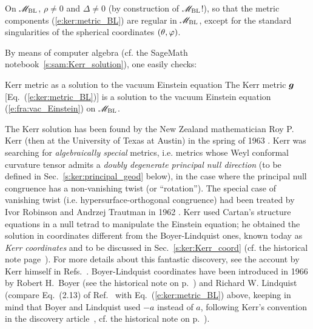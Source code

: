 \begin{remark}
On $\mathscr{M}_{\rm BL}$, $\rho\not=0$ and $\Delta\not=0$ (by construction
of $\mathscr{M}_{\rm BL}$!), so that the metric components (\ref{e:ker:metric_BL})
are regular in $\mathscr{M}_{\rm BL}$, except for the standard singularities of
the spherical coordinates $(\theta,\varphi)$.
\end{remark}

By means of computer algebra (cf. the SageMath notebook~\ref{s:sam:Kerr_solution}),
one easily checks:
\begin{tprop}{Kerr metric as a solution to the vacuum Einstein equation}{}
The Kerr metric $\bm{g}$ [Eq.~(\ref{e:ker:metric_BL})] is a solution to the vacuum
Einstein equation
(\ref{e:fra:vac_Einstein}) on $\mathscr{M}_{\rm BL}$.
\end{tprop}

\begin{hist}
\label{h:ker:Kerr_sol}
The Kerr solution has been found by the New Zealand mathematician Roy P. Kerr (then at the University of Texas at Austin) in the spring of 1963
\cite{Kerr63}. Kerr was searching for \emph{algebraically special} metrics, i.e. metrics whose Weyl conformal curvature
tensor admits a \emph{doubly degenerate principal null direction} (to be defined
in Sec.~\ref{s:ker:principal_geod} below), in the case where the
principal null congruence has a non-vanishing twist (or ``rotation''). The special case of vanishing twist (i.e. hypersurface-orthogonal
congruence) had been treated by Ivor Robinson and
Andrzej Trautman in 1962 \cite{RobinT62}.
Kerr used
Cartan's structure equations in a null tetrad
to manipulate the Einstein equation; he obtained the solution in coordinates different from the Boyer-Lindquist ones, known today as \emph{Kerr coordinates} and
to be discussed in Sec.~\ref{s:ker:Kerr_coord} (cf. the historical note page~\pageref{h:ker:Kerr_coord}). For more details about this fantastic discovery, see the
account by Kerr himself in Refs.~\cite{Kerr09,KrasiVK09}.
Boyer-Lindquist coordinates have been introduced in 1966 by Robert H.~Boyer (see the historical note on p.~\pageref{h:sta:Boyer}) and Richard W. Lindquist \cite{BoyerL67} (compare Eq.~(2.13) of Ref.~\cite{BoyerL67} with
Eq.~(\ref{e:ker:metric_BL}) above, keeping in mind that Boyer and Lindquist used
$-a$ instead of $a$, following Kerr's convention in the discovery article~\cite{Kerr63}, cf.
the historical note on p.~\pageref{h:ker:Kerr_coord}).
\end{hist}

